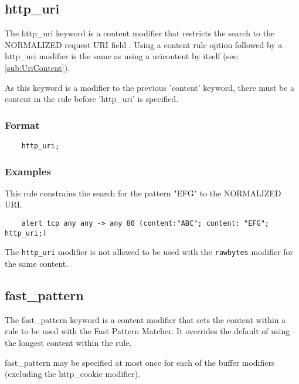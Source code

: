 \documentclass[english]{report}
\newenvironment{note}{
\samepage
    \vspace{10pt}{\textsf{
        {\hspace{7pt}\Huge{$\triangle$\hspace{-12.5pt}{\Large{$^!$}}}}\hspace{5pt}
        {\Large{NOTE}}
    }
    }
   \begin{center}
    \par\vspace{-17pt}

    \begin{lrbox}{\savepar}
    \begin{minipage}[r]{6in}
}
{
    \end{minipage}
    \end{lrbox}
    \fbox{
        \usebox{
            \savepar
	}
    }
    \par\vskip10pt
    \end{center}
}
\newenvironment{note}{
        \begin{rawhtml}
        <p><table border="1"><tr><td><b>
        Note:&nbsp;&nbsp;</b>
        \end{rawhtml}
}{
        \begin{rawhtml}
        </b></td></tr></table></p>
        \end{rawhtml}
}
\begin{document}
\subsection{http\_uri}
\label{sub:HttpUri}

The http\_uri keyword is a content modifier that restricts the search to the
NORMALIZED request \textsc{URI} field .  Using a content rule option followed
by a http\_uri modifier is the same as using a uricontent by itself (see:
\ref{sub:UriContent}).

As this keyword is a modifier to the previous 'content' keyword, there must be
a content in the rule before 'http\_uri' is specified.

\subsubsection{Format}

\begin{verbatim}
    http_uri;
\end{verbatim}

\subsubsection{Examples}

This rule constrains the search for the pattern "EFG" to the NORMALIZED URI.

\begin{verbatim}
    alert tcp any any -> any 80 (content:"ABC"; content: "EFG"; http_uri;)
\end{verbatim}

\begin{note}

The \texttt{http\_uri} modifier is not allowed to be used with the
\texttt{rawbytes} modifier for the same content.

\end{note}

\subsection{fast\_pattern}
\label{sub:FastPattern}

The fast\_pattern keyword is a content modifier that sets the content within a
rule to be used with the Fast Pattern Matcher.  It overrides the default of
using the longest content within the rule.

fast\_pattern may be specified at most once for each of the buffer modifiers
(excluding the http\_cookie modifier).
\end{document}
